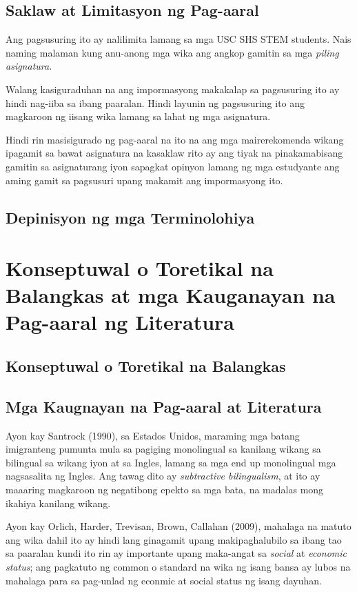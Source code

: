 \documentclass [11pt] {report}
\begin{document}
\pagebreak
\section {Saklaw at Limitasyon ng Pag-aaral}
Ang pagsusuring ito ay nalilimita lamang sa mga USC SHS STEM students. Nais
naming malaman kung anu-anong mga wika ang angkop gamitin sa mga \emph{piling
  asignatura}.

Walang kasiguraduhan na ang impormasyong makakalap sa pagsusuring ito ay hindi
nag-iiba sa ibang paaralan. Hindi layunin ng pagsusuring ito ang magkaroon ng
iisang wika lamang sa lahat ng mga asignatura.

Hindi rin masisigurado ng pag-aaral na ito na ang mga mairerekomenda wikang
ipagamit sa bawat asignatura na kasaklaw rito ay ang tiyak na pinakamabisang
gamitin sa asignaturang iyon sapagkat opinyon lamang ng mga estudyante ang aming
gamit sa pagsusuri upang makamit ang impormasyong ito.
\section{Depinisyon ng mga Terminolohiya}

\chapter{Konseptuwal o Toretikal na Balangkas at mga Kauganayan na Pag-aaral ng Literatura}
\section {Konseptuwal o Toretikal na Balangkas}
\pagebreak
\section {Mga Kaugnayan na Pag-aaral at Literatura}
Ayon kay Santrock (1990), sa Estados Unidos, maraming mga batang imigranteng
pumunta mula sa pagiging monolingual sa kanilang wikang sa bilingual sa wikang
iyon at sa Ingles, lamang sa mga end up monolingual mga nagsasalita ng Ingles.
Ang tawag dito ay \emph{subtractive bilingualism}, at ito ay maaaring magkaroon
ng negatibong epekto sa mga bata, na madalas mong ikahiya kanilang wikang.

Ayon kay Orlich, Harder, Trevisan, Brown, Callahan (2009), mahalaga na matuto ang
wika dahil ito ay hindi lang ginagamit upang makipaghalubilo sa ibang tao sa
paaralan kundi ito rin ay importante upang maka-angat sa \emph{social} at
\emph{economic status}; ang pagkatuto ng common o standard na wika ng isang
bansa ay lubos na mahalaga para sa pag-unlad ng econmic at social status ng
isang dayuhan.
\end{document}
